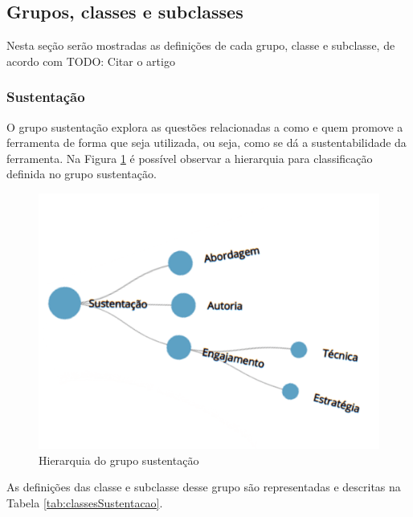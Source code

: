\subsection{Grupos, classes e subclasses}
\label{subsec:gruposClassesSubclasses}

\par
Nesta seção serão mostradas as definições de cada grupo, classe e subclasse, de acordo com TODO: Citar o artigo


\subsubsection{Sustentação}
\label{subsubsec:sustentacao}
O grupo sustentação explora as questões relacionadas a como e quem promove a ferramenta de forma que seja utilizada, ou seja, como se dá a sustentabilidade da ferramenta.
Na Figura \ref{fig:grupo-sustentacao} é possível observar a hierarquia para classificação definida no grupo sustentação.

\begin{figure}[!ht]
    \centering
    \includegraphics[scale=0.20]{./figuras/sustentacao.png}
    \caption{Hierarquia do grupo sustentação}
    \label{fig:grupo-sustentacao}
\end{figure}

\par
As definições das classe e subclasse desse grupo são representadas e descritas na Tabela \ref{tab:classesSustentacao}.

